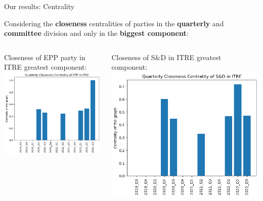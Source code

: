 \documentclass{beamer}
\begin{document}
\begin{frame}{Our results: Centrality}
	
	Considering the \textbf{closeness} centralities of parties in the \textbf{quarterly} and \textbf{committee} division and only in the \textbf{biggest component}:
	\vspace{4mm}
	\pause
	
\begin{columns}
	\begin{column}{0.5\textwidth}
	Closeness of EPP party in ITRE greatest component:
	\\
	\includegraphics[width=\textwidth]{img/EPP_ITRE_Q_closeness_BIG.png}
	\end{column}
	
	\pause 
	\begin{column}{0.5\textwidth}
	Closeness of S\&D in ITRE greatest component:
	\includegraphics[width=\textwidth]{img/S&D_ITRE_Q_closeness_BIG.png}
	\end{column}
\end{columns}

\end{frame}
\end{document}
